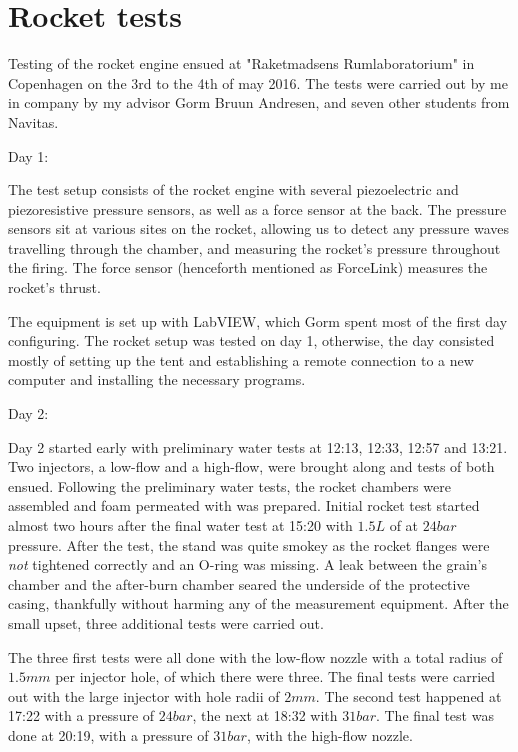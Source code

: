 \chapter{Rocket tests}

Testing of the rocket engine ensued at "Raketmadsens Rumlaboratorium" in Copenhagen on the 3rd to the 4th of may 2016. The tests were carried out by me in company by my advisor Gorm Bruun Andresen, and seven other students from Navitas.

Day 1:

The test setup consists of the rocket engine with several piezoelectric and piezoresistive pressure sensors, as well as a force sensor at the back. The pressure sensors sit at various sites on the rocket, allowing us to detect any pressure waves travelling through the chamber, and measuring the rocket's pressure throughout the firing. The force sensor (henceforth mentioned as ForceLink) measures the rocket's thrust.

The equipment is set up with LabVIEW, which Gorm spent most of the first day configuring. The rocket setup was tested on day 1, otherwise, the day consisted mostly of setting up the tent and establishing a remote connection to a new computer and installing the necessary programs.

Day 2:

Day 2 started early with preliminary water tests at 12:13, 12:33, 12:57 and 13:21. Two injectors, a low-flow and a high-flow, were brought along and tests of both ensued. Following the preliminary water tests, the rocket chambers were assembled and foam permeated with  was prepared. Initial rocket test started almost two hours after the final water test at 15:20 with $\si{1.5}{L}$ of  at $\si{24}{bar}$ pressure. After the test, the stand was quite smokey as the rocket flanges were \emph{not} tightened correctly and an O-ring was missing. A leak between the grain's chamber and the after-burn chamber seared the underside of the protective casing, thankfully without harming any of the measurement equipment. After the small upset, three additional tests were carried out. 

The three first tests were all done with the low-flow nozzle with a total radius of $\si{1.5}{mm}$ per injector hole, of which there were three. The final tests were carried out with the large injector with hole radii of $\si{2}{mm}$. The second test happened at 17:22 with a  pressure of $\si{24}{bar}$, the next at 18:32 with $\si{31}{bar}$. The final test was done at 20:19, with a  pressure of $\si{31}{bar}$, with the high-flow nozzle.

